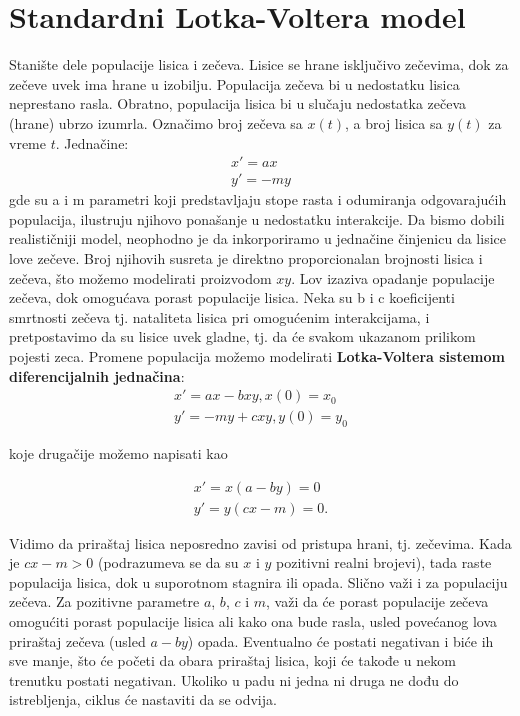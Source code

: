 \documentclass[a4paper]{article}
\begin{document}
\section{Standardni Lotka-Voltera model}
\label{sec:std_model}
Stanište dele populacije lisica i zečeva. Lisice se hrane isključivo zečevima,
dok za zečeve uvek ima hrane u izobilju. Populacija zečeva bi u nedostatku lisica
neprestano rasla. Obratno, populacija lisica bi u slučaju nedostatka zečeva (hrane) ubrzo izumrla.
Označimo broj zečeva sa $x(t)$, a broj lisica sa $y(t)$ za vreme $t$.
Jednačine:
    \begin{equation}
        \begin{aligned}
	    x' = ax \\
        y' = -my
        \end{aligned}
	\end{equation}
gde su a i m parametri koji predstavljaju stope rasta i odumiranja odgovarajućih populacija,
ilustruju njihovo ponašanje u nedostatku interakcije.
Da bismo dobili realističniji model, neophodno je da inkorporiramo u jednačine
činjenicu da lisice love zečeve. Broj njihovih susreta je direktno proporcionalan
brojnosti lisica i zečeva, što možemo modelirati proizvodom $xy$. Lov izaziva opadanje
populacije zečeva, dok omogućava porast populacije lisica.
Neka su b i c koeficijenti smrtnosti zečeva tj.
nataliteta lisica pri omogućenim interakcijama, i pretpostavimo da su lisice uvek gladne,
tj. da će svakom ukazanom prilikom pojesti zeca.
Promene populacija možemo modelirati \textbf{Lotka-Voltera sistemom diferencijalnih jednačina}:
    \begin{equation}
    \label{eq:standard_lv}
        \begin{aligned}
            x' = ax - bxy,   x(0)=x_0\\
            y' = -my + cxy,  y(0)=y_0
        \end{aligned}
    \end{equation}

koje drugačije možemo napisati kao

    \begin{equation}
        \label{eq:standard_lv_tf}
        \begin{aligned}
            x' = x (a - by) = 0\\
            y' = y (cx - m) = 0.
        \end{aligned}
    \end{equation}

Vidimo da priraštaj lisica neposredno zavisi od pristupa hrani, tj. zečevima.
Kada je $cx - m > 0$ (podrazumeva se da su $x$ i $y$ pozitivni realni brojevi),
tada raste populacija lisica, dok u suporotnom stagnira ili opada. Slično važi
i za populaciju zečeva. Za pozitivne parametre $a$, $b$, $c$ i $m$, važi da će porast populacije
zečeva omogućiti porast populacije lisica
ali kako ona bude rasla, usled povećanog lova priraštaj zečeva (usled $a - by$) opada.
Eventualno će postati negativan i biće ih sve manje, što će početi
da obara priraštaj lisica, koji će takođe u nekom trenutku postati negativan.
Ukoliko u padu ni jedna ni druga ne dođu do istrebljenja, ciklus će nastaviti da se odvija.
\end{document}
